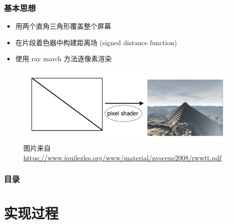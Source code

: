 \documentclass[aspectratio=169]{ctexbeamer} %
\begin{document}
\begin{frame}
    \frametitle{基本思想}
    \begin{itemize}
        \item 用两个直角三角形覆盖整个屏幕
        \item 在片段着色器中构建距离场 (signed distance function) %
        \item 使用 ray march 方法逐像素渲染 %
    \end{itemize}
    \begin{figure}[htbp]
        \centering
        \includegraphics[height=.5\textheight]{images/pre/iq_2tri.pdf}
        \caption{\footnotesize 图片来自 \url{https://www.iquilezles.org/www/material/nvscene2008/rwwtt.pdf}}
        \label{fig:iq_2tri}
    \end{figure}
\end{frame}

\begin{frame}
    \frametitle{目录}
    \tableofcontents
\end{frame}

\section{实现过程}
\end{document}
